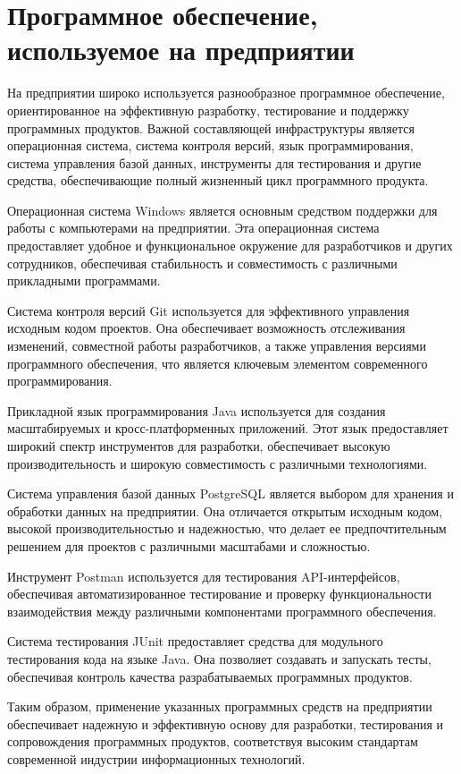 \documentclass[12pt,a4paper,draft]{report}
\begin{document}
\chapter{Программное обеспечение, используемое на предприятии}

На предприятии широко используется разнообразное программное обеспечение, ориентированное на эффективную разработку, тестирование и поддержку программных продуктов.
Важной составляющей инфраструктуры является операционная система, система контроля версий, язык программирования, система управления базой данных, инструменты для тестирования и другие средства, обеспечивающие полный жизненный цикл программного продукта.

Операционная система Windows является основным средством поддержки для работы с компьютерами на предприятии.
Эта операционная система предоставляет удобное и функциональное окружение для разработчиков и других сотрудников, обеспечивая стабильность и совместимость с различными прикладными программами.

Система контроля версий Git используется для эффективного управления исходным кодом проектов.
Она обеспечивает возможность отслеживания изменений, совместной работы разработчиков, а также управления версиями программного обеспечения, что является ключевым элементом современного программирования.

Прикладной язык программирования Java используется для создания масштабируемых и кросс-платформенных приложений.
Этот язык предоставляет широкий спектр инструментов для разработки, обеспечивает высокую производительность и широкую совместимость с различными технологиями.

Система управления базой данных PostgreSQL является выбором для хранения и обработки данных на предприятии.
Она отличается открытым исходным кодом, высокой производительностью и надежностью, что делает ее предпочтительным решением для проектов с различными масштабами и сложностью.

Инструмент Postman используется для тестирования API-интерфейсов, обеспечивая автоматизированное тестирование и проверку функциональности взаимодействия между различными компонентами программного обеспечения.

Система тестирования JUnit предоставляет средства для модульного тестирования кода на языке Java.
Она позволяет создавать и запускать тесты, обеспечивая контроль качества разрабатываемых программных продуктов.

Таким образом, применение указанных программных средств на предприятии обеспечивает надежную и эффективную основу для разработки, тестирования и сопровождения программных продуктов, соответствуя высоким стандартам современной индустрии информационных технологий.
\end{document}
